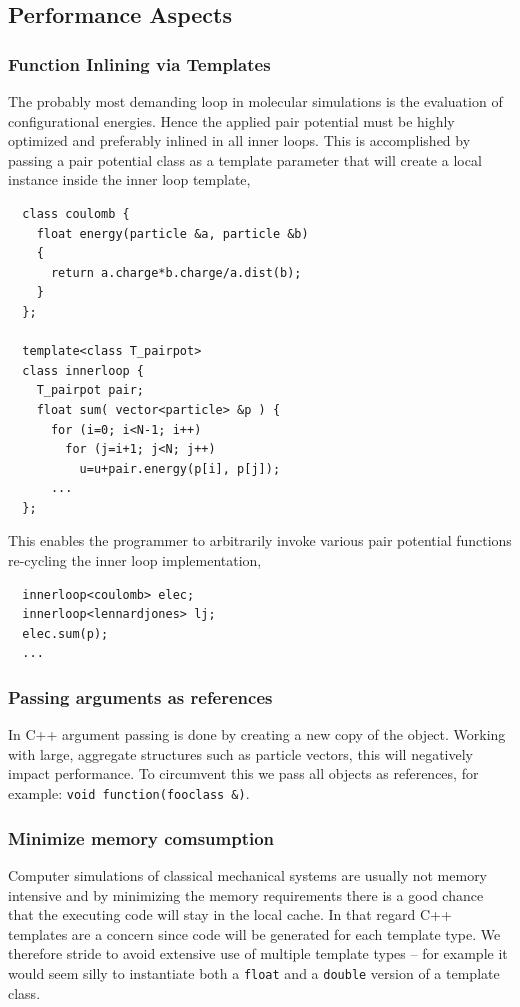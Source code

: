 \documentclass[10pt]{bmc_article}
\newenvironment{bmcformat}{\fussy\setboolean{publ}{true}}{\fussy}
\begin{document}
\begin{bmcformat}
\subsection*{Performance Aspects}
\subsubsection*{Function Inlining via Templates}
The probably most demanding loop in molecular simulations is the evaluation of configurational energies.
Hence the applied pair potential must be highly optimized and preferably inlined in all inner loops.
This is accomplished by passing a pair potential class as a template parameter that will create a local instance inside the inner loop template,
\begin{verbatim}
  class coulomb {
    float energy(particle &a, particle &b)
    {
      return a.charge*b.charge/a.dist(b);
    }
  };

  template<class T_pairpot>
  class innerloop {
    T_pairpot pair;
    float sum( vector<particle> &p ) {
      for (i=0; i<N-1; i++)
        for (j=i+1; j<N; j++) 
          u=u+pair.energy(p[i], p[j]);
      ...
  };
\end{verbatim}
This enables the programmer to arbitrarily invoke various pair potential functions re-cycling the inner loop implementation,
\begin{verbatim}
  innerloop<coulomb> elec;
  innerloop<lennardjones> lj;
  elec.sum(p);
  ...
\end{verbatim}

\subsubsection*{Passing arguments as references}
In C++ argument passing is done by creating a new copy of the object. Working with large, aggregate structures such as particle vectors, this will negatively impact performance. To circumvent this we pass all objects as references, for example: \verb"void function(fooclass &)".

\subsubsection*{Minimize memory comsumption}
Computer simulations of classical mechanical systems are usually not memory intensive and by minimizing the memory requirements there is a good chance that the executing code will stay in the local cache. In that regard C++ templates are a concern since code will be generated for each template type. We therefore stride to avoid extensive use of multiple template types -- for example it would seem silly to instantiate both a \verb"float" and a \verb"double" version of a template class.


\end{bmcformat}
\end{document}
